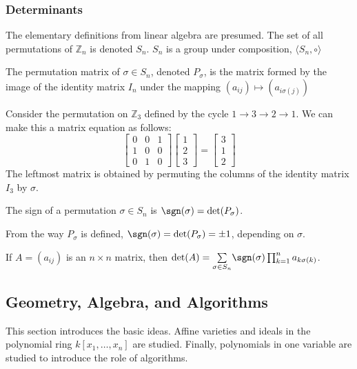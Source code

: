 \documentclass[crop=false,class=book]{standalone}
\begin{document}
\subsubsection{Determinants}
The elementary definitions from linear algebra are presumed. The set of all permutations of $\mathbb{Z}_{n}$ is denoted $S_n$. $S_{n}$ is a group under composition, $\langle S_{n},\circ\rangle$
\begin{definition}
The permutation matrix of $\sigma \in S_{n}$, denoted $P_{\sigma}$, is the matrix formed by the image of the identity matrix $I_{n}$ under the mapping $(a_{ij})\mapsto (a_{i\sigma(j)})$
\end{definition}
\begin{example}
Consider the permutation on $\mathbb{Z}_3$ defined by the cycle $1\rightarrow 3 \rightarrow 2 \rightarrow 1$. We can make this a matrix equation as follows:
\begin{equation*}
    \begin{bmatrix} 0 & 0 & 1 \\ 1 & 0 & 0 \\ 0 & 1 & 0 \end{bmatrix} \begin{bmatrix} 1 \\ 2 \\ 3 \end{bmatrix} = \begin{bmatrix} 3 \\ 1 \\ 2 \end{bmatrix}    
\end{equation*}
The leftmost matrix is obtained by permuting the columns of the identity matrix $I_{3}$ by $\sigma$.
\end{example}
\begin{definition}
The sign of a permutation $\sigma\in S_{n}$ is $\sgn(\sigma) = \det(P_{\sigma})$.
\end{definition}
\begin{remark}
From the way $P_{\sigma}$ is defined, $\sgn(\sigma) = \det(P_{\sigma}) = \pm 1$, depending on $\sigma$.
\end{remark}
\begin{theorem}
If $A=(a_{ij})$ is an $n\times n$ matrix, then $\det(A) = \underset{\sigma \in S_n}\sum \sgn(\sigma) \prod_{k=1}^{n} a_{k\sigma(k)}$.
\end{theorem}
\subsection{Geometry, Algebra, and Algorithms}
This section introduces the basic ideas. Affine varieties and ideals in the polynomial ring $k[x_1,\hdots ,x_n]$ are studied. Finally, polynomials in one variable are studied to introduce the role of algorithms.
\end{document}
